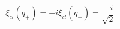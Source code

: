 \begin{equation}
\label{wxiplus}
{\widetilde \xi}_{cl}(q_+)=-i \xi_{cl}(q_+)=\frac{-i}{\sqrt{2}}
\end{equation}

